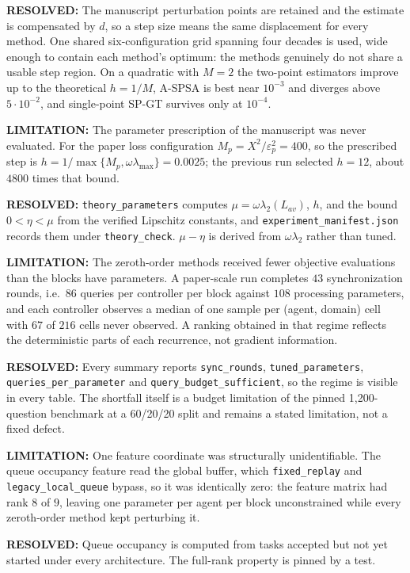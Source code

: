 \documentclass[11pt]{article}
\newcommand{\Warning}[1]{\par\noindent\textcolor{warning}{\textbf{LIMITATION:} #1}\par}
\newcommand{\Resolved}[1]{\par\noindent\textcolor{confirmed}{\textbf{RESOLVED:} #1}\par}
\begin{document}
\Resolved{The manuscript perturbation points are retained and the estimate is
compensated by $d$, so a step size means the same displacement for every
method. One shared six-configuration grid spanning four decades is used, wide
enough to contain each method's optimum: the methods genuinely do not share a
usable step region. On a quadratic with $M=2$ the two-point estimators improve
up to the theoretical $h=1/M$, A-SPSA is best near $10^{-3}$ and diverges
above $5\cdot 10^{-2}$, and single-point SP-GT survives only at $10^{-4}$.}

\Warning{The parameter prescription of the manuscript was never evaluated. For
the paper loss configuration $M_p=X^2/\varepsilon_p^2=400$, so the prescribed
step is $h=1/\max\{M_p,\omega\lambda_{\max}\}=0.0025$; the previous run
selected $h=12$, about $4800$ times that bound.}

\Resolved{\texttt{theory\_parameters} computes $\mu=\omega\lambda_2(L_{av})$,
$h$, and the bound $0<\eta<\mu$ from the verified Lipschitz constants, and
\texttt{experiment\_manifest.json} records them under \texttt{theory\_check}.
$\mu-\eta$ is derived from $\omega\lambda_2$ rather than tuned.}

\Warning{The zeroth-order methods received fewer objective evaluations than
the blocks have parameters. A paper-scale run completes $43$ synchronization
rounds, i.e.\ $86$ queries per controller per block against $108$ processing
parameters, and each controller observes a median of one sample per
(agent, domain) cell with $67$ of $216$ cells never observed. A ranking
obtained in that regime reflects the deterministic parts of each recurrence,
not gradient information.}

\Resolved{Every summary reports \texttt{sync\_rounds},
\texttt{tuned\_parameters}, \texttt{queries\_per\_parameter} and
\texttt{query\_budget\_sufficient}, so the regime is visible in every table.
The shortfall itself is a budget limitation of the pinned 1{,}200-question
benchmark at a 60/20/20 split and remains a stated limitation, not a fixed
defect.}

\Warning{One feature coordinate was structurally unidentifiable. The queue
occupancy feature read the global buffer, which \texttt{fixed\_replay} and
\texttt{legacy\_local\_queue} bypass, so it was identically zero: the feature
matrix had rank $8$ of $9$, leaving one parameter per agent per block
unconstrained while every zeroth-order method kept perturbing it.}

\Resolved{Queue occupancy is computed from tasks accepted but not yet started
under every architecture. The full-rank property is pinned by a test.}
\end{document}
